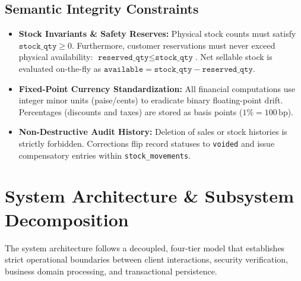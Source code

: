 \documentclass[12pt, a4paper]{report}
\begin{document}
\section{Semantic Integrity Constraints}
\begin{itemize}[leftmargin=1.5em]
  \item \textbf{Stock Invariants \& Safety Reserves:} Physical stock counts must satisfy $\texttt{stock\_qty} \ge 0$. Furthermore, customer reservations must never exceed physical availability: $\texttt{reserved\_qty} \le \texttt{stock\_qty}$. Net sellable stock is evaluated on-the-fly as $\texttt{available} = \texttt{stock\_qty} - \texttt{reserved\_qty}$.
  \item \textbf{Fixed-Point Currency Standardization:} All financial computations use integer minor units (paise/cents) to eradicate binary floating-point drift. Percentages (discounts and taxes) are stored as basis points ($1\% = 100\,\text{bp}$).
  \item \textbf{Non-Destructive Audit History:} Deletion of sales or stock histories is strictly forbidden. Corrections flip record statuses to \texttt{voided} and issue compensatory entries within \texttt{stock\_movements}.
\end{itemize}

\clearpage
\chapter{System Architecture \& Subsystem Decomposition}
The system architecture follows a decoupled, four-tier model that establishes strict operational boundaries between client interactions, security verification, business domain processing, and transactional persistence.
\end{document}
